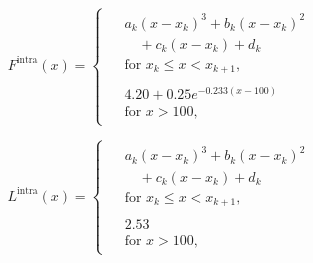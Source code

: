 \documentclass{jsai2e}
\begin{document}
\begin{equation}
  \label{eq:pitch_intra}
F^{\mathrm{intra}}(x)=
\begin{cases}
\begin{aligned}
& a_k(x-x_k)^3 + b_k(x-x_k)^2 \\
& \quad + c_k(x-x_k) + d_k \\
& \text{for } x_k \le x < x_{k+1},
\end{aligned}\\
\begin{aligned}
& 4.20 + 0.25e^{-0.233(x-100)} \\
& \text{for } x>100,
\end{aligned}
\end{cases}
\end{equation}

\begin{equation}
  \label{eq:stride_intra}
L^{\mathrm{intra}}(x)=
\begin{cases}
\begin{aligned}
& a_k(x-x_k)^3 + b_k(x-x_k)^2 \\
& \quad + c_k(x-x_k) + d_k \\
& \text{for } x_k \le x < x_{k+1},
\end{aligned}\\
\begin{aligned}
& 2.53 \\
& \text{for } x>100,
\end{aligned}
\end{cases}
\end{equation}
\end{document}
